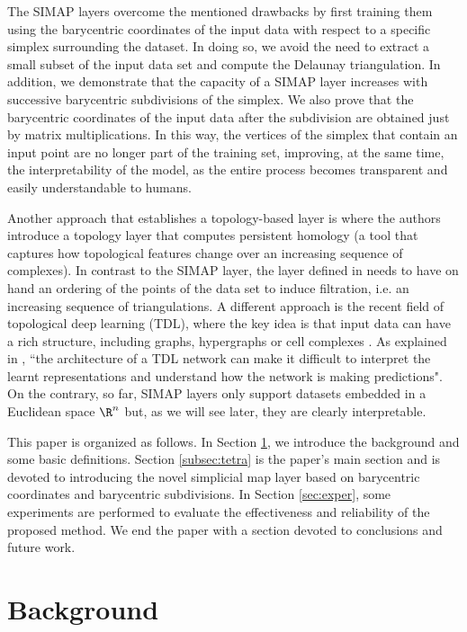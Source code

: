 The SIMAP layers overcome the mentioned drawbacks by first training them using the barycentric coordinates of the input data with respect to a specific simplex surrounding the dataset. 
In doing so, we avoid the need to extract a small subset of the input data set and compute the Delaunay triangulation. In addition, we demonstrate that the capacity of a SIMAP layer increases with successive barycentric subdivisions of the simplex.
We also prove that the barycentric coordinates of the input data after the subdivision are obtained just by matrix multiplications. 
In this way, the vertices of the simplex that contain an input point are no longer part of the training set, improving, at the same time, the interpretability of the model, as the entire process becomes transparent and easily understandable to humans. 

Another approach that establishes a topology-based layer is
\cite{pmlr-v108-gabrielsson20a} where the authors introduce a topology layer that computes persistent homology (a tool that captures how topological features change
over an increasing sequence of complexes).
In contrast to the SIMAP layer, the layer defined in \cite{pmlr-v108-gabrielsson20a}
needs to have on hand an ordering of the points of the data set to induce filtration, i.e. an increasing sequence of triangulations.
A different approach is the recent field of topological deep learning (TDL), where the key idea is that input data can have a rich structure, including graphs, hypergraphs or cell complexes \cite{hajij}. 
As explained in \cite[page 60]{hajij}, ``the architecture of a TDL network can make it difficult to interpret the learnt representations and understand how the network is making predictions".
On the contrary, so far, SIMAP layers only support datasets embedded in a Euclidean space $\R^n$ 
but, as we will see later, they are clearly interpretable.

This paper is organized as follows. 
In Section \ref{sec:background}, we introduce the background and some basic definitions. 
Section \ref{subsec:tetra} is the paper's main section and is devoted to introducing the novel simplicial map layer based on barycentric coordinates and barycentric subdivisions. 
In Section \ref{sec:exper}, some experiments are performed to evaluate the effectiveness and reliability of the proposed method. 
We end the paper with a section devoted to conclusions and future work.

\section{Background}\label{sec:background}

